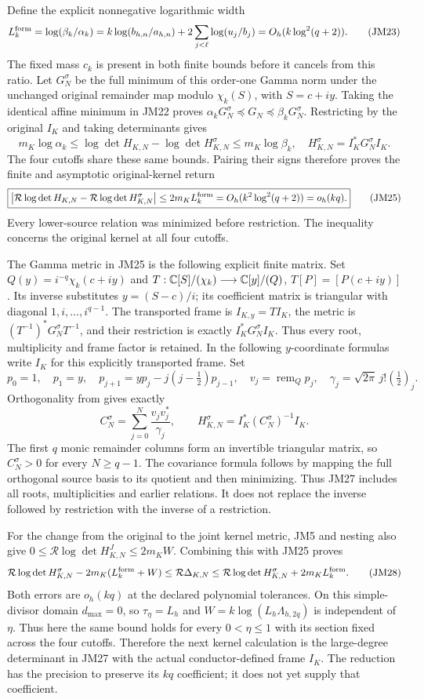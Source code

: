 Define the explicit nonnegative logarithmic width
\[
 L_k^{\rm form}=\log(\beta_k/\alpha_k)
 =k\log(b_{h,n}/a_{h,n})
   +2\sum_{j<\ell}\log(u_j/b_j)
 =O_h(k\log^2(q+2)).\tag{JM23}
\]
The fixed mass $c_k$ is present in both finite bounds before it
cancels from this ratio. Let $G_N^\sigma$ be the full minimum of
this order-one Gamma norm under the unchanged original remainder
map modulo $\chi_k(S)$, with $S=c+iy$.
Taking the identical affine minimum in JM22 proves
$\alpha_kG_N^\sigma\preceq G_N\preceq\beta_kG_N^\sigma$.
Restricting by the original $I_K$ and taking determinants gives
\[
 m_K\log\alpha_k\le
 \log\det H_{K,N}-\log\det H_{K,N}^\sigma
 \le m_K\log\beta_k,
 \quad H_{K,N}^\sigma=I_K^*G_N^\sigma I_K.\tag{JM24}
\]
The four cutoffs share these same bounds. Pairing their signs
therefore proves the finite and asymptotic original-kernel return
\[
 \boxed{\left|\mathcal R\log\det H_{K,N}
 -\mathcal R\log\det H_{K,N}^\sigma\right|
 \le2m_KL_k^{\rm form}=O_h(k^2\log^2(q+2))=o_h(kq).}
 \tag{JM25}
\]
Every lower-source relation was minimized before restriction.
The inequality concerns the original kernel at all four cutoffs.

The Gamma metric in JM25 is the following explicit finite matrix.
Set $Q(y)=i^{-q}\chi_k(c+iy)$ and
$T:\mathbb C[S]/(\chi_k)\longrightarrow\mathbb C[y]/(Q)$,
$T[P]=[P(c+iy)]$. Its inverse substitutes $y=(S-c)/i$;
its coefficient matrix is triangular with diagonal $1,i,\ldots,i^{q-1}$.
The transported frame is $I_{K,y}=TI_K$, the metric is
$(T^{-1})^*G_N^\sigma T^{-1}$, and their restriction is exactly
$I_K^*G_N^\sigma I_K$. Thus every root, multiplicity and frame
factor is retained. In the following $y$-coordinate formulas write
$I_K$ for this explicitly transported frame. Set
\[
 p_0=1,\quad p_1=y,\quad
 p_{j+1}=yp_j-j(j-\tfrac12)p_{j-1},\quad
 v_j=\operatorname{rem}_{Q}p_j,\quad
 \gamma_j=\sqrt{2\pi}\,j!(\tfrac12)_j.
 \tag{JM26}
\]
Orthogonality from \cite{mrjm:MP} gives exactly
\[
 C_N^\sigma=\sum_{j=0}^N\frac{v_jv_j^*}{\gamma_j},\qquad
 H_{K,N}^\sigma=I_K^*(C_N^\sigma)^{-1}I_K.\tag{JM27}
\]
The first $q$ monic remainder columns form an invertible triangular
matrix, so $C_N^\sigma>0$ for every $N\ge q-1$. The covariance
formula follows by mapping the full orthogonal source basis to its
quotient and then minimizing. Thus JM27 includes all roots,
multiplicities and earlier relations. It does not replace the
inverse followed by restriction with the inverse of a restriction.

For the change from the original to the joint kernel metric,
JM5 and nesting also give
$0\le\mathcal R\log\det H_{K,N}^J\le2m_KW$.
Combining this with JM25 proves
\[
 \mathcal R\log\det H_{K,N}^\sigma-2m_K(L_k^{\rm form}+W)
 \le\mathcal R\Delta_{K,N}
 \le\mathcal R\log\det H_{K,N}^\sigma+2m_KL_k^{\rm form}.
 \tag{JM28}
\]
Both errors are $o_h(kq)$ at the declared polynomial tolerances.
On this simple-divisor domain $d_{\max}=0$, so
$\tau_\eta=L_h$ and $W=k\log(L_h\Lambda_{h,2q})$ is independent of
$\eta$. Thus here the same bound holds for every $0<\eta\le1$
with its section fixed across the four cutoffs.
Therefore the next kernel calculation is the large-degree
determinant in JM27 with the actual conductor-defined frame $I_K$.
The reduction has the precision to preserve its $kq$ coefficient;
it does not yet supply that coefficient.

